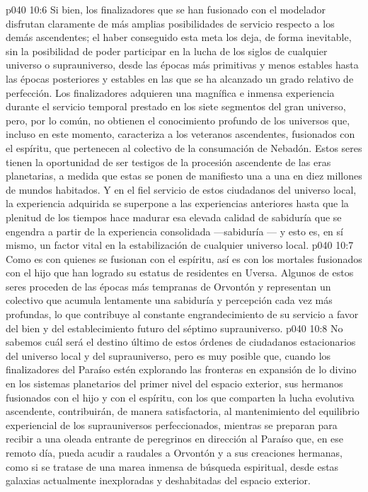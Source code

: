 \vs p040 10:6 \pc Si bien, los finalizadores que se han fusionado con el modelador disfrutan claramente de más amplias posibilidades de servicio respecto a los demás ascendentes; el haber conseguido esta meta los deja, de forma inevitable, sin la posibilidad de poder participar en la lucha de los siglos de cualquier universo o suprauniverso, desde las épocas más primitivas y menos estables hasta las épocas posteriores y estables en las que se ha alcanzado un grado relativo de perfección. Los finalizadores adquieren una magnífica e inmensa experiencia durante el servicio temporal prestado en los siete segmentos del gran universo, pero, por lo común, no obtienen el conocimiento profundo de los universos que, incluso en este momento, caracteriza a los veteranos ascendentes, fusionados con el espíritu, que pertenecen al colectivo de la consumación de Nebadón. Estos seres tienen la oportunidad de ser testigos de la procesión ascendente de las eras planetarias, a medida que estas se ponen de manifiesto una a una en diez millones de mundos habitados. Y en el fiel servicio de estos ciudadanos del universo local, la experiencia adquirida se superpone a las experiencias anteriores hasta que la plenitud de los tiempos hace madurar esa elevada calidad de sabiduría que se engendra a partir de la experiencia consolidada ---sabiduría --- y esto es, en sí mismo, un factor vital en la estabilización de cualquier universo local.
\vs p040 10:7 Como es con quienes se fusionan con el espíritu, así es con los mortales fusionados con el hijo que han logrado su estatus de residentes en Uversa. Algunos de estos seres proceden de las épocas más tempranas de Orvontón y representan un colectivo que acumula lentamente una sabiduría y percepción cada vez más profundas, lo que contribuye al constante engrandecimiento de su servicio a favor del bien y del establecimiento futuro del séptimo suprauniverso.
\vs p040 10:8 \pc No sabemos cuál será el destino último de estos órdenes de ciudadanos estacionarios del universo local y del suprauniverso, pero es muy posible que, cuando los finalizadores del Paraíso estén explorando las fronteras en expansión de lo divino en los sistemas planetarios del primer nivel del espacio exterior, sus hermanos fusionados con el hijo y con el espíritu, con los que comparten la lucha evolutiva ascendente, contribuirán, de manera satisfactoria, al mantenimiento del equilibrio experiencial de los suprauniversos perfeccionados, mientras se preparan para recibir a una oleada entrante de peregrinos en dirección al Paraíso que, en ese remoto día, pueda acudir a raudales a Orvontón y a sus creaciones hermanas, como si se tratase de una marea inmensa de búsqueda espiritual, desde estas galaxias actualmente inexploradas y deshabitadas del espacio exterior.

